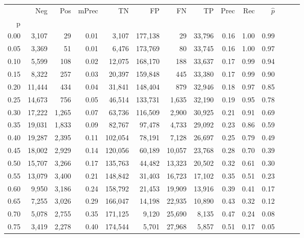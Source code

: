 \begin{tabular}{rrrrrrrrrrrrrr}
\toprule
{} &     Neg &    Pos & mPrec &       TN &       FP &      FN &      TP &  Prec &   Rec & $\hat{p}$ \\
p    &         &        &       &          &          &         &         &       &       &           \\
\midrule
0.00 &   3,107 &     29 &  0.01 &    3,107 &  177,138 &      29 &  33,796 &  0.16 &  1.00 &      0.99 \\
0.05 &   3,369 &     51 &  0.01 &    6,476 &  173,769 &      80 &  33,745 &  0.16 &  1.00 &      0.97 \\
0.10 &   5,599 &    108 &  0.02 &   12,075 &  168,170 &     188 &  33,637 &  0.17 &  0.99 &      0.94 \\
0.15 &   8,322 &    257 &  0.03 &   20,397 &  159,848 &     445 &  33,380 &  0.17 &  0.99 &      0.90 \\
0.20 &  11,444 &    434 &  0.04 &   31,841 &  148,404 &     879 &  32,946 &  0.18 &  0.97 &      0.85 \\
0.25 &  14,673 &    756 &  0.05 &   46,514 &  133,731 &   1,635 &  32,190 &  0.19 &  0.95 &      0.78 \\
0.30 &  17,222 &  1,265 &  0.07 &   63,736 &  116,509 &   2,900 &  30,925 &  0.21 &  0.91 &      0.69 \\
0.35 &  19,031 &  1,833 &  0.09 &   82,767 &   97,478 &   4,733 &  29,092 &  0.23 &  0.86 &      0.59 \\
0.40 &  19,287 &  2,395 &  0.11 &  102,054 &   78,191 &   7,128 &  26,697 &  0.25 &  0.79 &      0.49 \\
0.45 &  18,002 &  2,929 &  0.14 &  120,056 &   60,189 &  10,057 &  23,768 &  0.28 &  0.70 &      0.39 \\
0.50 &  15,707 &  3,266 &  0.17 &  135,763 &   44,482 &  13,323 &  20,502 &  0.32 &  0.61 &      0.30 \\
0.55 &  13,079 &  3,400 &  0.21 &  148,842 &   31,403 &  16,723 &  17,102 &  0.35 &  0.51 &      0.23 \\
0.60 &   9,950 &  3,186 &  0.24 &  158,792 &   21,453 &  19,909 &  13,916 &  0.39 &  0.41 &      0.17 \\
0.65 &   7,255 &  3,026 &  0.29 &  166,047 &   14,198 &  22,935 &  10,890 &  0.43 &  0.32 &      0.12 \\
0.70 &   5,078 &  2,755 &  0.35 &  171,125 &    9,120 &  25,690 &   8,135 &  0.47 &  0.24 &      0.08 \\
0.75 &   3,419 &  2,278 &  0.40 &  174,544 &    5,701 &  27,968 &   5,857 &  0.51 &  0.17 &      0.05 \\

\end{tabular}
